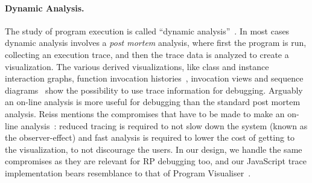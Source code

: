 \paragraph{Dynamic Analysis.}
The study of program execution is called ``dynamic analysis''~\cite{cornelissen2009systematic}.
In most cases dynamic analysis involves a \textit{post mortem} analysis, 
where first the program is run, collecting an execution trace, and then the trace data is analyzed to create a visualization.
The various derived visualizations, like class and instance interaction graphs, function invocation histories~\cite{lange1995program}, invocation views and sequence diagrams~\cite{cornelissen2008execution} show the possibility to use trace information for debugging.
Arguably an on-line analysis is more useful for debugging than the standard post mortem analysis. Reiss mentions the compromises that have to be made to make an on-line analysis~\cite{reiss2006visualizing}: 
reduced tracing is required to not slow down the system (known as the observer-effect) and
fast analysis is required to lower the cost of getting to the visualization, to not discourage the users.
In our design, we handle the same compromises as they are relevant for RP debugging too, and our JavaScript trace implementation bears resemblance to that of Program Visualiser~\cite{lange1995program}.




